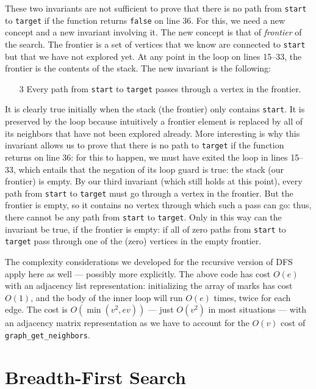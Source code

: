 These two invariants are not sufficient to prove that there is no path
from \lstinline'start' to \lstinline'target' if the function returns
\lstinline'false' on line 36.  For this, we need a new
concept and a new invariant involving it.  The new concept is that of
\emph{frontier} of the search.  The frontier is a set of vertices that
we know are connected to \lstinline'start' but that we have not
explored yet.  At any point in the loop on
lines 15--33, the frontier is the
contents of the stack.  The new invariant is the following:
\begin{enumerate}\em
\item[3]%
  Every path from \lstinline'start' to \lstinline'target' passes
  through a vertex in the frontier.
\end{enumerate}
It is clearly true initially when the stack (the frontier) only
contains \lstinline'start'.  It is preserved by the loop because
intuitively a frontier element is replaced by all of its neighbors
that have not been explored already.  More interesting is why this
invariant allows us to prove that there is no path to
\lstinline'target' if the function returns on line 36:
for this to happen, we must have exited the loop in
lines 15--33, which entails that the
negation of its loop guard is true: the stack (our frontier) is empty.
By our third invariant (which still holds at this point), every path
from \lstinline'start' to \lstinline'target' must go through a vertex
in the frontier.  But the frontier is empty, so it contains no vertex
through which such a pass can go: thus, there cannot be any path from
\lstinline'start' to \lstinline'target'.  Only in this way can the
invariant be true, if the frontier is empty: if all of zero paths from
\lstinline'start' to \lstinline'target' pass through one of the (zero)
vertices in the empty frontier.

\medskip

The complexity considerations we developed for the recursive version
of DFS apply here as well --- possibly more explicitly.  The above
code has cost $O(e)$ with an adjacency list representation:
initializing the array of marks has cost $O(1)$, and the body of the
inner loop will run $O(e)$ times, twice for each edge.  The cost is
$O(\min(v^2,ev))$ --- just $O(v^2)$ in most situations --- with an
adjacency matrix representation as we have to account for the $O(v)$
cost of \lstinline'graph_get_neighbors'.


\section{Breadth-First Search}
\label{sec:graphsearch:bfs}

